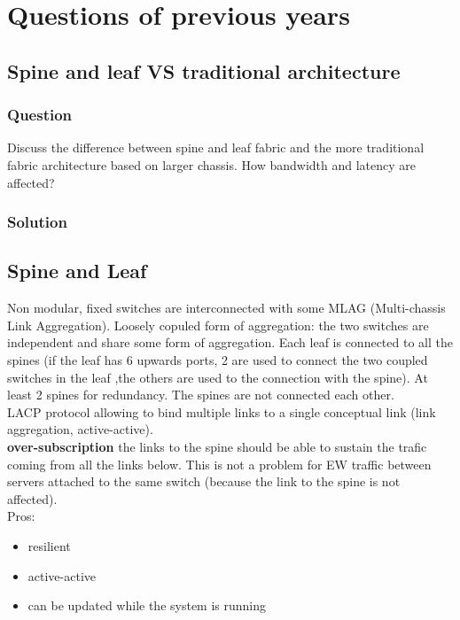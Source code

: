 \chapter{Questions of previous years}
\section{Spine and leaf VS traditional
architecture}\label{spine-and-leaf-vs-traditional-architecture}

\hypertarget{question}{%
\subsection{Question}\label{question}}

Discuss the difference between spine and leaf fabric and the more
traditional fabric architecture based on larger chassis. How bandwidth
and latency are affected?

\hypertarget{solution}{%
\subsection{Solution}\label{solution}}

\hypertarget{spine-and-leaf}{%
\section{Spine and Leaf}\label{spine-and-leaf}}

Non modular, fixed switches are interconnected with some MLAG
(Multi-chassis Link Aggregation). Loosely copuled form of aggregation:
the two switches are independent and share some form of aggregation.
Each leaf is connected to all the spines (if the leaf has 6 upwards
ports, 2 are used to connect the two coupled switches in the leaf ,the
others are used to the connection with the spine). At least 2 spines for
redundancy. The spines are not connected each other.\\
LACP protocol allowing to bind multiple links to a single conceptual
link (link aggregation, active-active).\\
\textbf{over-subscription} the links to the spine should be able to
sustain the trafic coming from all the links below. This is not a
problem for EW traffic between servers attached to the same switch
(because the link to the spine is not affected).\\
Pros:

\begin{itemize}
\item
  resilient
\item
  active-active
\item
  can be updated while the system is running
\end{itemize}

